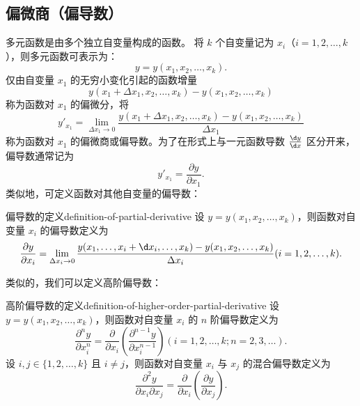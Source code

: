 \subsection{偏微商（偏导数）}\label{subsec:partial-derivative}

多元函数是由多个独立自变量构成的函数。
将 $ k $ 个自变量记为 $ x_i $（$ i = 1, 2, \ldots , k $），则多元函数可表示为：
\begin{equation}
    y = y(x_1 , x_2 , \ldots , x_k) .
\end{equation}
仅由自变量 $ x_1 $ 的无穷小变化引起的函数增量
\begin{equation*}
    y(x_1 + \Delta x_1 , x_2 , \ldots , x_k) - y(x_1 , x_2 , \ldots , x_k)
\end{equation*}
称为函数对 $ x_1 $ 的偏微分，将
\begin{equation}
    y'_{x_1} = \lim_{\Delta x_1 \to 0} \frac{y(x_1 + \Delta x_1 , x_2 , \ldots , x_k) - y(x_1 , x_2 , \ldots , x_k)}{\Delta x_1}
\end{equation}
称为函数对 $ x_1 $ 的偏微商或偏导数。为了在形式上与一元函数导数 $ \frac{\d y}{\d x} $ 区分开来，偏导数通常记为
\begin{equation}
    y'_{x_1} = \frac{\partial y}{\partial x_1} .
\end{equation}
类似地，可定义函数对其他自变量的偏导数：
\begin{definition}{偏导数的定义}{definition-of-partial-derivative}
    设 $ y = y(x_1 , x_2 , \ldots , x_k) $，则函数对自变量 $ x_i $ 的偏导数定义为
    \begin{equation}
        \frac{\partial y}{\partial x_i} = \lim_{\Delta x_i \to 0} \frac{y(x_1 , \ldots , x_i + \d x_i , \ldots , x_k) - y(x_1 , x_2 , \ldots , x_k)}{\Delta x_i} (i = 1, 2, \ldots , k) .
    \end{equation}
\end{definition}

类似的，我们可以定义高阶偏导数：
\begin{definition}{高阶偏导数的定义}{definition-of-higher-order-partial-derivative}
    设 $ y = y(x_1 , x_2 , \ldots , x_k) $，则函数对自变量 $ x_i $ 的 $ n $ 阶偏导数定义为
    \begin{equation}
        \frac{\partial^n y}{\partial x_i^n} = \frac{\partial}{\partial x_i} \left( \frac{\partial^{n-1} y}{\partial x_i^{n-1}} \right) (i = 1, 2, \ldots , k; n = 2, 3, \ldots ) .
    \end{equation}
    设 $ i , j \in \{ 1, 2, \ldots , k \} $ 且 $ i \neq j $，则函数对自变量 $ x_i $ 与 $ x_j $ 的混合偏导数定义为
    \begin{equation}
        \frac{\partial^2 y}{\partial x_i \partial x_j} = \frac{\partial}{\partial x_i} \left( \frac{\partial y}{\partial x_j} \right) .
    \end{equation}
\end{definition}

